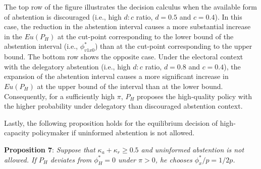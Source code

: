 \documentclass[letterpaper, 12pt]{article}
\begin{document}
    \par The top row of the figure illustrates the decision calculus when the available form of abstention is discouraged (i.e., high $d:c$ ratio, $d=0.5$ and $c=0.4$). In this case, the reduction in the abstention interval causes a more substantial increase in the $Eu(P_H)$ at the cut-point corresponding to the lower bound of the abstention interval (i.e., $\phi^*_{v1x0}$) than at the cut-point corresponding to the upper bound. The bottom row shows the opposite case. Under the electoral context with the delegatory abstention (i.e., high $d:c$ ratio, $d=0.8$ and $c=0.4$), the expansion of the abstention interval causes a more significant increase in $Eu(P_H)$ at the upper bound of the interval than at the lower bound. Consequently, for a sufficiently high $\pi$, $P_H$ proposes the high-quality policy with the higher probability under delegatory than discouraged abstention context.
    
    \par Lastly, the following proposition holds for the equilibrium decision of high-capacity policymaker if uninformed abstention is not allowed. 
    
    \noindent \textbf{Proposition 7}: \textit{Suppose that $\kappa_a+\kappa_r \geq 0.5$ and uninformed abstention is not allowed. If $P_H$ deviates from $\phi^*_H=0$ under $\pi>0$, he chooses $\phi^*_x/p=1/2p$.}  
\end{document}
